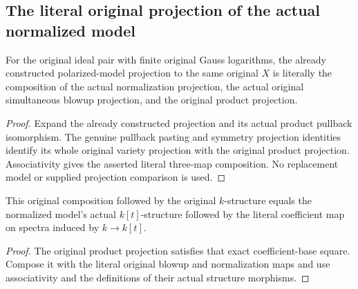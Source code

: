 \subsection{The literal original projection of the actual normalized model}

\begin{lemma}
\label{local:actual-normalized-original-projection}
\leanok
{}
For the original ideal pair with finite original Gauss logarithms, the already
constructed polarized-model projection to the same original $X$ is literally
the composition of the actual normalization projection, the actual original
simultaneous blowup projection, and the original product projection.
\end{lemma}
\begin{proof}
Expand the already constructed projection and its actual product pullback
isomorphism. The genuine pullback pasting and symmetry projection identities
identify its whole original variety projection with the original product
projection. Associativity gives the asserted literal three-map composition.
No replacement model or supplied projection comparison is used.
\end{proof}

\begin{lemma}
\label{local:actual-normalized-original-projection-base}
\leanok
{}
This original composition followed by the original $k$-structure equals the
normalized model's actual $k[t]$-structure followed by the literal coefficient
map on spectra induced by $k\to k[t]$.
\end{lemma}
\begin{proof}
The original product projection satisfies that exact coefficient-base square.
Compose it with the literal original blowup and normalization maps and use
associativity and the definitions of their actual structure morphisms.
\end{proof}

